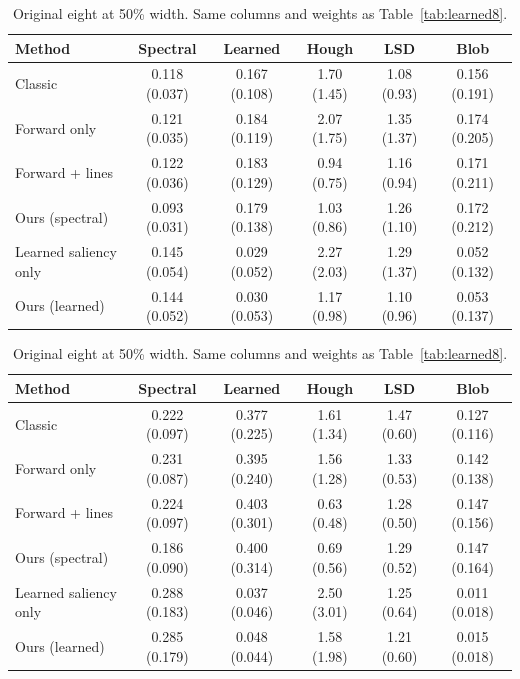 \documentclass[10pt,twocolumn,letterpaper]{article}
\begin{document}
\begin{table}[t]
\vspace{1.4em}
\caption{Seeded 30-image sample at 75\% width, seed 604. Johanneskirche and \texttt{obama} were not drawn. Columns match Table~\ref{tab:learned8}. Ours (learned) is not claimed to be better unless the sign tests say so.}
\label{tab:learned30}
{\scriptsize
\begin{tabular}{lccccc}
\toprule
Method & Spectral & Learned & Hough & LSD & Blob \\
\midrule
Classic & 0.118 (0.037) & 0.167 (0.108) & 1.70 (1.45) & 1.08 (0.93) & 0.156 (0.191) \\
Forward only & 0.121 (0.035) & 0.184 (0.119) & 2.07 (1.75) & 1.35 (1.37) & 0.174 (0.205) \\
Forward + lines & 0.122 (0.036) & 0.183 (0.129) & 0.94 (0.75) & 1.16 (0.94) & 0.171 (0.211) \\
Ours (spectral) & 0.093 (0.031) & 0.179 (0.138) & 1.03 (0.86) & 1.26 (1.10) & 0.172 (0.212) \\
Learned saliency only & 0.145 (0.054) & 0.029 (0.052) & 2.27 (2.03) & 1.29 (1.37) & 0.052 (0.132) \\
Ours (learned) & 0.144 (0.052) & 0.030 (0.053) & 1.17 (0.98) & 1.10 (0.96) & 0.053 (0.137) \\
\bottomrule
\end{tabular}}

\vspace{1.4em}
\caption{Original eight at 50\% width. Same columns and weights as Table~\ref{tab:learned8}.}
\label{tab:learned850}
{\scriptsize
\begin{tabular}{lccccc}
\toprule
Method & Spectral & Learned & Hough & LSD & Blob \\
\midrule
Classic & 0.222 (0.097) & 0.377 (0.225) & 1.61 (1.34) & 1.47 (0.60) & 0.127 (0.116) \\
Forward only & 0.231 (0.087) & 0.395 (0.240) & 1.56 (1.28) & 1.33 (0.53) & 0.142 (0.138) \\
Forward + lines & 0.224 (0.097) & 0.403 (0.301) & 0.63 (0.48) & 1.28 (0.50) & 0.147 (0.156) \\
Ours (spectral) & 0.186 (0.090) & 0.400 (0.314) & 0.69 (0.56) & 1.29 (0.52) & 0.147 (0.164) \\
Learned saliency only & 0.288 (0.183) & 0.037 (0.046) & 2.50 (3.01) & 1.25 (0.64) & 0.011 (0.018) \\
Ours (learned) & 0.285 (0.179) & 0.048 (0.044) & 1.58 (1.98) & 1.21 (0.60) & 0.015 (0.018) \\
\bottomrule
\end{tabular}}
\end{table}
\end{document}
